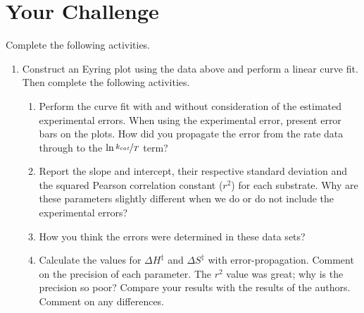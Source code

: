 \documentclass{tufte-handout}
\begin{document}
\clearpage

\section{Your Challenge}

Complete the following activities.

\begin{enumerate}
\item Construct an Eyring plot using the data above and perform a linear curve fit. Then complete the following activities.

\begin{enumerate}
\item Perform the curve fit with and without consideration of the estimated experimental errors. When using the experimental error, present error bars on the plots. How did you propagate the error from the rate data through to the $\ln{\nicefrac{k_{cat}}{T}}$ term?

\item Report the slope and intercept, their respective standard deviation and the squared Pearson correlation constant ($r^2$) for each substrate. Why are these parameters slightly different when we do or do not include the exp\-er\-i\-ment\-al errors?

\item How you think the errors were determined in these data sets?

\item Calculate the values for $\Delta H^\ddagger$ and $\Delta S^\ddagger$ with error-propagation.
Com\-ment on the precision of each parameter. The $r^2$ value was great; why is the precision so poor? Compare your results with the results of the authors. Comment on any differences.


\end{enumerate}
\end{enumerate}
\end{document}

